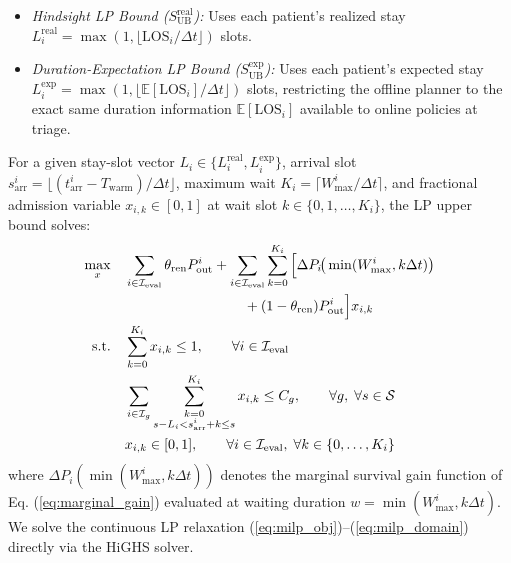 \documentclass[final,5p,times,twocolumn]{elsarticle}
\begin{document}
\begin{enumerate}[(a)]
    \begin{itemize}
        \item \textit{Hindsight LP Bound ($S_{\text{UB}}^{\text{real}}$):} Uses each patient's realized stay $L_i^{\text{real}} = \max(1, \lfloor \text{LOS}_i / \Delta t \rfloor)$ slots.
        \item \textit{Duration-Expectation LP Bound ($S_{\text{UB}}^{\text{exp}}$):} Uses each patient's expected stay $L_i^{\text{exp}} = \max(1, \lfloor \mathbb{E}[\text{LOS}_i] / \Delta t \rfloor)$ slots, restricting the offline planner to the exact same duration information $\mathbb{E}[\text{LOS}_i]$ available to online policies at triage.
    \end{itemize}
\end{enumerate}

For a given stay-slot vector $L_i \in \{L_i^{\text{real}}, L_i^{\text{exp}}\}$, arrival slot $s_{\text{arr}}^i = \lfloor (t_{\text{arr}}^i - T_{\text{warm}}) / \Delta t \rfloor$, maximum wait $K_i = \lceil W_{\max}^i / \Delta t \rceil$, and fractional admission variable $x_{i,k} \in [0, 1]$ at wait slot $k \in \{0, 1, \dots, K_i\}$, the LP upper bound solves:
\begin{align}
    \max_{x} \quad & \sum_{i \in \mathcal{I}_{\text{eval}}} \theta_{\text{ren}} P_{\text{out}}^i + \sum_{i \in \mathcal{I}_{\text{eval}}} \sum_{k=0}^{K_i} \Big[ \Delta P_i\!\big(\min(W_{\max}^i, k\Delta t)\big) \nonumber \\
    & \hspace{8.5em} + (1 - \theta_{\text{ren}}) P_{\text{out}}^i \Big] x_{i,k} \label{eq:milp_obj} \\
    \text{s.t.} \quad & \sum_{k=0}^{K_i} x_{i,k} \le 1, \qquad \forall i \in \mathcal{I}_{\text{eval}} \label{eq:milp_assign} \\
    & \sum_{i \in \mathcal{I}_g} \sum_{\substack{k=0 \\ s - L_i < s_{\text{arr}}^i + k \le s}}^{K_i} x_{i,k} \le C_g, \qquad \forall g, \; \forall s \in \mathcal{S} \label{eq:milp_cap} \\
    & x_{i,k} \in [0, 1], \qquad \forall i \in \mathcal{I}_{\text{eval}}, \; \forall k \in \{0, \dots, K_i\} \label{eq:milp_domain}
\end{align}
where $\Delta P_i(\min(W_{\max}^i, k\Delta t))$ denotes the marginal survival gain function of Eq. (\ref{eq:marginal_gain}) evaluated at waiting duration $w = \min(W_{\max}^i, k\Delta t)$. We solve the continuous LP relaxation (\ref{eq:milp_obj})--(\ref{eq:milp_domain}) directly via the HiGHS solver.
\end{document}
